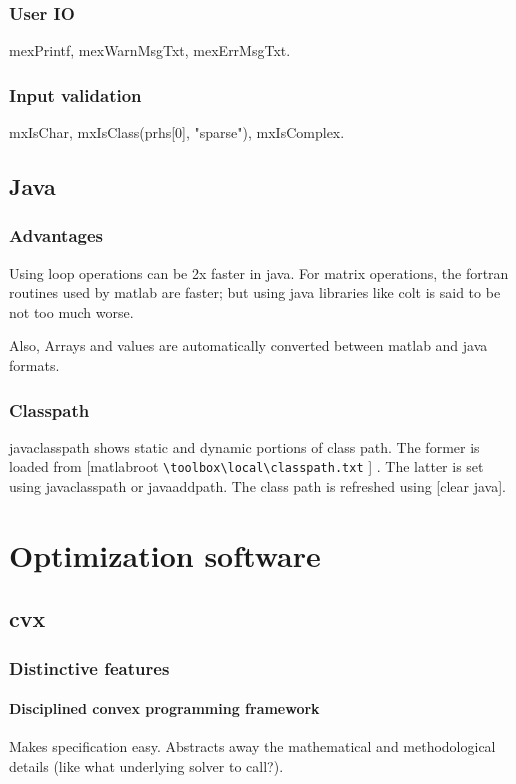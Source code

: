 \subsection{User IO}
mexPrintf, mexWarnMsgTxt, mexErrMsgTxt.

\subsection{Input validation}
mxIsChar, mxIsClass(prhs[0], "sparse"), mxIsComplex.

\section{Java}
\subsection{Advantages}
Using loop operations can be 2x faster in java. For matrix operations, the fortran routines used by matlab are faster; but using java libraries like colt is said to be not too much worse.

Also, Arrays and values are automatically converted between matlab and java formats.


\subsection{Classpath}
javaclasspath shows static and dynamic portions of class path. The former is loaded from [matlabroot \verb '\toolbox\local\classpath.txt' ]
. The latter is set using javaclasspath or javaaddpath. The class path is refreshed using [clear java].

\chapter{Optimization software}
\section{cvx}
\subsection{Distinctive features}
\subsubsection{Disciplined convex programming framework}
Makes specification easy. Abstracts away the mathematical and methodological details (like what underlying solver to call?).

